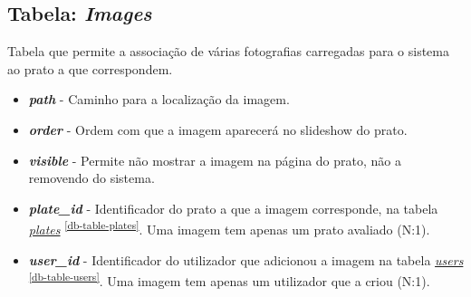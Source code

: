 \documentclass[11pt, a4paper, sans]{article}
\begin{document}
	\subsection{Tabela: \textit{Images}} \label{db-table-plate-images}

	Tabela que permite a associação de várias fotografias carregadas para o sistema ao prato a que correspondem. 
	
	\begin{itemize}
		\item \textbf{\textit{path}} - Caminho para a localização da imagem.
		\item \textbf{\textit{order}} - Ordem com que a imagem aparecerá no slideshow do prato.
		\item \textbf{\textit{visible}} - Permite não mostrar a imagem na página do prato, não a removendo do sistema.		
		\item \textbf{\textit{plate\_id}} - Identificador do prato a que a imagem corresponde, na tabela 
		\underline{\textit{plates}} \textsuperscript{\ref{db-table-plates}}. 
		Uma imagem tem apenas um prato avaliado (N:1).
		\item \textbf{\textit{user\_id}} - Identificador do utilizador que adicionou a imagem na tabela 
		\underline{\textit{users}} \textsuperscript{\ref{db-table-users}}.
		Uma imagem tem apenas um utilizador que a criou (N:1).
	\end{itemize}
\end{document}
